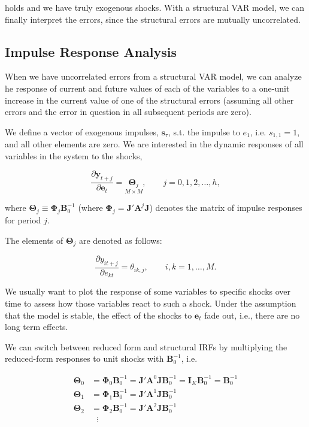 holds and we have truly exogenous shocks. With a structural VAR model, we can finally interpret the errors, since the structural errors are mutually uncorrelated.


\subsection{Impulse Response Analysis}

When we have uncorrelated errors from a structural VAR model, we can analyze he response of current and future values of each of the variables to a one‐unit increase in the current value of one of the structural errors (assuming all other errors and the error in question in all subsequent periods are zero).

We define a vector of exogenous impulses, $\bm{s}_\tau$, s.t. the impulse to $e_1$, i.e. $s_{1,1}=1$, and all other elements are zero. We are interested in the dynamic responses of all variables in the system to the shocks,

\begin{equation}
	\frac{\partial \bm{y}_{t+j}}{\partial \bm{e}_t} = \underset{M\times M}{\bm{\Theta}_j}, \qquad j = 0,1,2,\dots,h,
\end{equation}

where $\bm{\Theta}_j \equiv \bm{\Phi}_j\bm{B}_0^{-1}$ (where $\bm{\Phi}_j = \bm{J}'\bm{A}^j\bm{J}$) denotes the matrix of impulse responses for period $j$.

The elements of $\bm{\Theta}_j$ are denoted as follows:

\[
	\frac{\partial y_{it+j}}{\partial e_{kt}} = \theta_{ik,j},\qquad i,k=1,\dots,M.
\]

We usually want to plot the response of some variables to specific shocks over time to assess how those variables react to such a shock. Under the assumption that the model is stable, the effect of the shocks to $\bm{e}_t$ fade out, i.e., there are no long term effects. 

We can switch between reduced form and structural IRFs by multiplying the reduced-form responses to unit shocks with $\bm{B}_0^{-1}$, i.e.

\begin{align*}
	\bm{\Theta}_0 &= \bm{\Phi}_0\bm{B}_0^{-1} = \bm{J}'\bm{A}^0\bm{JB}_0^{-1} = \bm{I}_K\bm{B}_0^{-1} = \bm{B}_0^{-1} \\
	\bm{\Theta}_1 &= \bm{\Phi}_1\bm{B}_0^{-1} = \bm{J}'\bm{A}^1\bm{JB}_0^{-1} \\
	\bm{\Theta}_2 &= \bm{\Phi}_2\bm{B}_0^{-1} = \bm{J}'\bm{A}^2\bm{JB}_0^{-1} \\
	&\:\:\:\vdots
\end{align*}

